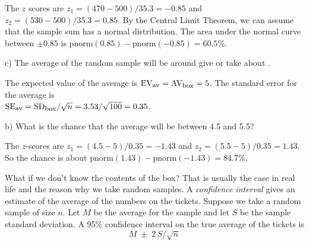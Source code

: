 \documentclass[10pt]{article}
\begin{document}
The $z$ scores are $z_1 = (470-500)/35.3 = -0.85$ and $z_2=(530-500)/35.3 = 0.85$.  By the
Central Limit Theorem, we can assume that the sample sum has a normal distribution.
The area under the normal curve between $\pm 0.85$ is $\mbox{pnorm}(0.85) - \mbox{pnorm}(-0.85)=
60.5\%$.
\medskip

\hspace{10pt} c) The average of the random sample will be around \underline{\hspace{.5in}}
give or take about \underline{\hspace{.5in}}.

The expected value of the average is
$\mbox{EV}_{\mbox{\footnotesize av}}=\mbox{AV}_{\mbox{\footnotesize box}} = 5$.
The standard error for the average is\\
$\mbox{SE}_{\mbox{\footnotesize av}}= \mbox{SD}_{\mbox{\footnotesize box}}/\sqrt{n} =
3.53/\sqrt{100} = 0.35$.
\medskip
  
\hspace{10pt} b) What is the chance that the average will be between 4.5 and 5.5?

The $z$-scores are $z_1= (4.5-5)/0.35 = -1.43$ and $z_2 = (5.5-5)/0.35=1.43$.
So the chance is about $\mbox{pnorm}(1.43) - \mbox{pnorm}(-1.43) = 84.7\%$.

%
\newcommand{\twobox}[2]{\begin{pspicture}(-0.3,0.2)(2,1.3)
\psframe(0,0)(0.7,0.7)\rput(0.35,0.35){#1}
\psframe(1,0)(1.7,0.7)\rput(1.35,0.35){#2}
\psline(-0.3,0.9)(-0.3,-0.2)(2,-0.2)(2,0.9)(-0.3,0.9)
\end{pspicture}}
%
\newcommand{\threebox}[3]{\begin{pspicture}(0.2,0.2)(2.5,1.3)
\psframe(0,0)(0.7,0.7)\rput(0.35,0.35){#1}
\psframe(1,0)(1.7,0.7)\rput(1.35,0.35){#2}
\psframe(2,0)(2.7,0.7)\rput(2.35,0.35){#3}
\psline(-0.3,0.9)(-0.3,-0.2)(3,-0.2)(3,0.9)(-0.3,0.9)
\end{pspicture}}

\newcommand{\VS}{\vspace{.3in}}
\bigskip

What if we don't know the contents of the box?  That is usually the case in real life
and the reason why we take random samples.  A \textit{confidence interval} gives an
estimate of the average of the numbers on the tickets.  Suppose we take a 
random sample of size $n$. Let $M$ be the average for the sample and let  $S$ be
the sample standard deviation.  A 95\% confidence interval on the true average of the tickets is
\[M \; \pm\; 2\,S/\sqrt{n}\]
\end{document}

